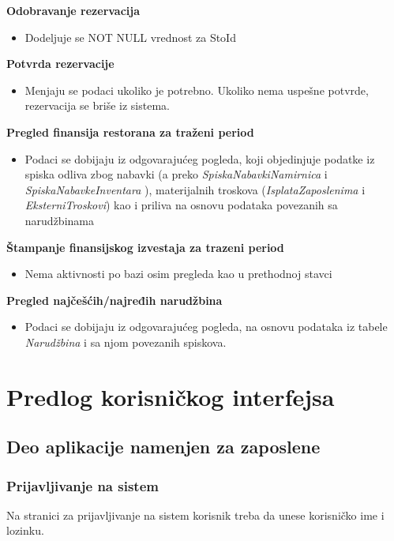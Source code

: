 \documentclass{article}
\begin{document}
\textbf{Odobravanje rezervacija}
\begin{itemize}
\item Dodeljuje se NOT NULL vrednost za StoId 
\end{itemize}

\textbf{Potvrda rezervacije}
\begin{itemize}
\item Menjaju se podaci ukoliko je potrebno. Ukoliko nema uspešne potvrde, rezervacija se briše iz sistema.
\end{itemize}

\textbf{Pregled finansija restorana za traženi period}
\begin{itemize}
\item  Podaci se dobijaju iz odgovarajućeg pogleda, koji objedinjuje podatke iz spiska odliva zbog nabavki (a preko \emph{SpiskaNabavkiNamirnica} i \emph{SpiskaNabavkeInventara} ), materijalnih troskova (\emph{IsplataZaposlenima} i \emph{EksterniTroskovi}) kao i priliva na osnovu podataka povezanih sa narudžbinama 
\end{itemize}

\textbf{Štampanje finansijskog izvestaja za trazeni period}
\begin{itemize}
\item Nema aktivnosti po bazi osim pregleda kao u prethodnoj stavci 
\end{itemize}

\textbf{Pregled najčešćih/najređih narudžbina}
\begin{itemize}
\item Podaci se dobijaju iz odgovarajućeg pogleda, na osnovu podataka iz tabele \emph{Narudžbina} i sa njom povezanih spiskova.
\end{itemize}


\section{Predlog korisničkog interfejsa}

\subsection{Deo aplikacije namenjen za zaposlene}
\subsubsection{Prijavljivanje na sistem}
Na stranici za prijavljivanje na sistem korisnik treba da unese korisničko ime i lozinku.\\
\end{document}
